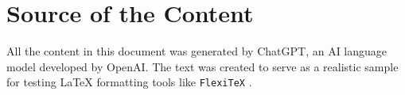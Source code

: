 \section{Source of the Content}
All the content in this document was generated by ChatGPT, an AI language model developed by OpenAI. The text was created to serve as a realistic sample for testing LaTeX formatting tools like
\texttt{Flexi\TeX}
.

